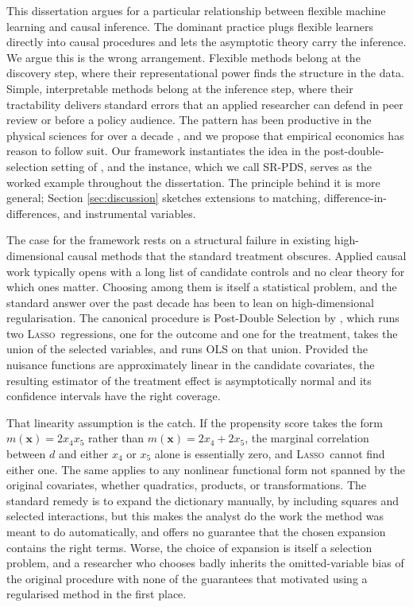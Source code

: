 \documentclass[11pt, a4paper]{article}
\theoremstyle{plain}
\theoremstyle{definition}
\theoremstyle{remark}
\newcommand{\lasso}{\textsc{Lasso}}
\newcommand{\epds}{\textsc{SR-PDS}}
\begin{document}
This dissertation argues for a particular relationship between
flexible machine learning and causal inference. The dominant
practice plugs flexible learners directly into causal procedures
and lets the asymptotic theory carry the inference. We argue
this is the wrong arrangement. Flexible methods belong at the
discovery step, where their representational power finds the
structure in the data. Simple, interpretable methods belong at
the inference step, where their tractability delivers standard
errors that an applied researcher can defend in peer review or
before a policy audience. The pattern has been productive in
the physical sciences for over a decade
\citep{schmidt2009gp, cranmer2020}, and we propose that empirical
economics has reason to follow suit. Our framework instantiates
the idea in the post-double-selection setting of
\citet{bch2014}, and the instance, which we call \epds, serves
as the worked example throughout the dissertation. The principle
behind it is more general; Section \ref{sec:discussion} sketches
extensions to matching, difference-in-differences, and
instrumental variables.

The case for the framework rests on a structural failure in
existing high-dimensional causal methods that the standard
treatment obscures. Applied causal work typically opens with a
long list of candidate controls and no clear theory for which
ones matter. Choosing among them is itself a statistical
problem, and the standard answer over the past decade has been
to lean on high-dimensional regularisation. The canonical
procedure is Post-Double Selection by \citet{bch2014}, which
runs two \lasso\ regressions, one for the outcome and one for
the treatment, takes the union of the selected variables, and
runs OLS on that union. Provided the nuisance functions are
approximately linear in the candidate covariates, the resulting
estimator of the treatment effect is asymptotically normal and
its confidence intervals have the right coverage.

That linearity assumption is the catch. If the propensity score
takes the form $m(\bm{x}) = 2 x_4 x_5$ rather than $m(\bm{x}) = 2
x_4 + 2 x_5$, the marginal correlation between $d$ and either $x_4$
or $x_5$ alone is essentially zero, and \lasso\ cannot find either
one. The same applies to any nonlinear functional form not spanned
by the original covariates, whether quadratics, products, or
transformations. The standard remedy is to expand the dictionary manually, by
including squares and selected interactions, but this makes the
analyst do the work the method was meant to do automatically, and
offers no guarantee that the chosen expansion contains the right
terms. Worse, the choice of expansion is itself a selection problem,
and a researcher who chooses badly inherits the omitted-variable
bias of the original procedure with none of the guarantees that
motivated using a regularised method in the first place.
\end{document}
